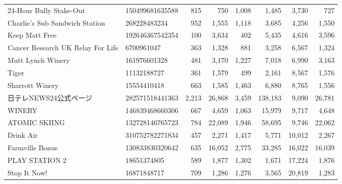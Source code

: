 \begin{longtable}{llrrrrrr}
                           24-Hour Bully Stake-Out &  150499681635588 &     815 &         750 &      1,008 &       1,485 &         3,730 &        727 \\
                    Charlie's Sub Sandwich Station &     268228483234 &     952 &       1,555 &      1,118 &       3,685 &         4,256 &      1,550 \\
                                    Keep Matt Free &  192646367542354 &     100 &       3,634 &        402 &       5,435 &         4,616 &      3,596 \\
                 Cancer Research UK Relay For Life &       6700961047 &     363 &       1,328 &        881 &       3,258 &         6,567 &      1,324 \\
                                 Mutt Lynch Winery &     161976601328 &     481 &       3,170 &      1,227 &       7,018 &         6,990 &      3,163 \\
                                             Tiger &      11132188727 &     361 &       1,579 &        499 &       2,161 &         8,567 &      1,576 \\
                                   Sharrott Winery &      15554410418 &     663 &       1,585 &      1,463 &       6,880 &         8,765 &      1,556 \\
                                    日テレNEWS24公式ページ &  282571518441363 &   2,213 &      26,868 &      3,459 &     138,183 &         9,090 &     26,781 \\
                                            WINERY &  146839468660306 &     667 &       4,659 &      1,063 &      15,979 &         9,717 &      4,648 \\
                                     ATOMIC SKIING &  132728146765723 &     784 &      22,089 &      1,946 &      58,695 &         9,746 &     22,062 \\
                                         Drink Air &  310752782271834 &     457 &       2,271 &      1,417 &       5,771 &        10,012 &      2,267 \\
                                   Farmville Bonus &  130833830320642 &     635 &      16,052 &      2,775 &      33,285 &        16,022 &     16,039 \\
                                    PLAY STATION 2 &      18651374805 &     589 &       1,877 &      1,302 &       1,671 &        17,224 &      1,876 \\
                                      Stop It Now! &      16871848717 &     709 &       1,286 &      1,276 &       3,565 &        20,819 &      1,283 \\

\end{longtable}
